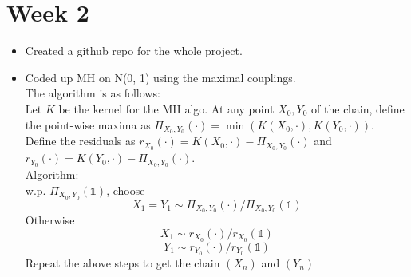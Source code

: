 \documentclass{article}
\begin{document}
	\section{Week 2}
		\begin{itemize}
			\item Created a github repo for the whole project.
			\item Coded up MH on N(0, 1) using the maximal couplings. \\
			The algorithm is as follows: \\
			Let $K$ be the kernel for the MH algo. At any point $X_0, Y_0$ of the chain, define the point-wise maxima as $\Pi_{X_0, Y_0}(\cdot) = \min(K(X_0, \cdot), K(Y_0, \cdot))$.\\
			Define the residuals as $r_{X_0}(\cdot) = K(X_0, \cdot) - \Pi_{X_0, Y_0}(\cdot)$ and $r_{Y_0}(\cdot) = K(Y_0, \cdot) - \Pi_{X_0, Y_0}(\cdot)$.\\
			Algorithm: \\
			w.p. $\Pi_{X_0, Y_0}(\mathbb{1})$, choose
				$$X_1 = Y_1 \sim \Pi_{X_0, Y_0}(\cdot)/\Pi_{X_0, Y_0}(\mathbb{1})$$
			Otherwise
				$$X_1 \sim r_{X_0}(\cdot)/r_{X_0}(\mathbb{1})$$
				$$Y_1 \sim r_{Y_0}(\cdot)/r_{Y_0}(\mathbb{1})$$
			Repeat the above steps to get the chain $(X_n)$ and $(Y_n)$


\end{itemize}
\end{document}
